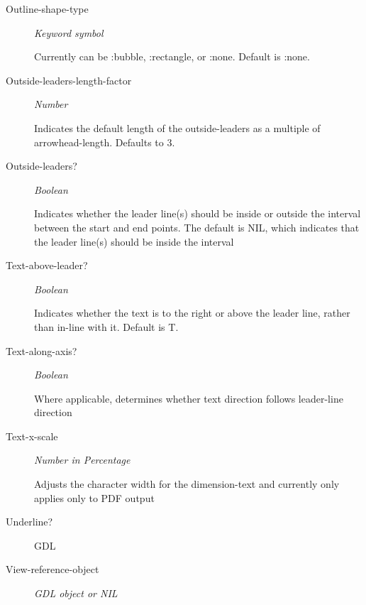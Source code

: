 \documentclass [11pt]{book}
\begin{document}
\begin{itemize}
\begin{description}
\item [Outline-shape-type]
\emph{Keyword symbol}

 Currently can be :bubble, :rectangle, or :none. Default is :none.




\item [Outside-leaders-length-factor]
\emph{Number}

 Indicates the default length of the outside-leaders as a multiple of arrowhead-length.
Defaults to 3.




\item [Outside-leaders?]
\emph{Boolean}

 Indicates whether the leader line(s) should be inside or outside the interval between the start and
end points. The default is NIL, which indicates that the leader line(s) should be inside the interval




\item [Text-above-leader?]
\emph{Boolean}

 Indicates whether the text is to the right or above the leader line, rather than in-line with it. Default is T.




\item [Text-along-axis?]
\emph{Boolean}

 Where applicable, determines whether text direction follows leader-line direction




\item [Text-x-scale]
\emph{Number in Percentage}

 Adjusts the character width for the dimension-text and currently only applies only to PDF output




\item [Underline?]

GDL




\item [View-reference-object]
\emph{GDL object or NIL}


\end{description}
\end{itemize}
\end{document}
